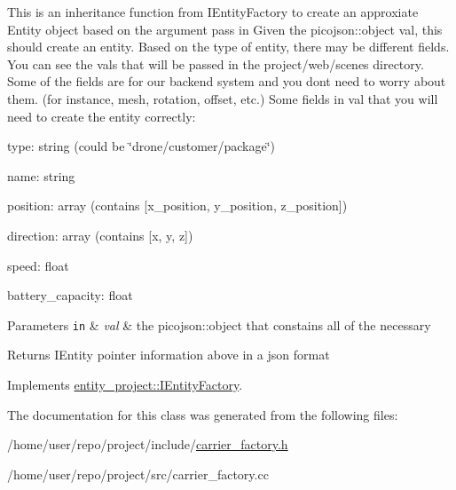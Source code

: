 This is an inheritance function from I\+Entity\+Factory to create an approxiate Entity object based on the argument pass in Given the picojson\+::object val, this should create an entity. Based on the type of entity, there may be different fields. You can see the vals that will be passed in the project/web/scenes directory. Some of the fields are for our backend system and you don\textquotesingle{}t need to worry about them. (for instance, mesh, rotation, offset, etc.) Some fields in val that you will need to create the entity correctly\+: 

type\+: string (could be \char`\"{}drone/customer/package\char`\"{})

name\+: string

position\+: array (contains \mbox{[}x\+\_\+position, y\+\_\+position, z\+\_\+position\mbox{]})

direction\+: array (contains \mbox{[}x, y, z\mbox{]})

speed\+: float

battery\+\_\+capacity\+: float 
\begin{DoxyParams}[1]{Parameters}
\mbox{\tt in}  & {\em val} & the picojson\+::object that constains all of the necessary \\
\hline
\end{DoxyParams}
\begin{DoxyReturn}{Returns}
I\+Entity pointer information above in a json format 
\end{DoxyReturn}


Implements \hyperlink{classentity__project_1_1IEntityFactory_ac4e8eaf4294958fef0b98bd3684704bb}{entity\+\_\+project\+::\+I\+Entity\+Factory}.



The documentation for this class was generated from the following files\+:\begin{DoxyCompactItemize}
\item 
/home/user/repo/project/include/\hyperlink{carrier__factory_8h}{carrier\+\_\+factory.\+h}\item 
/home/user/repo/project/src/carrier\+\_\+factory.\+cc\end{DoxyCompactItemize}
